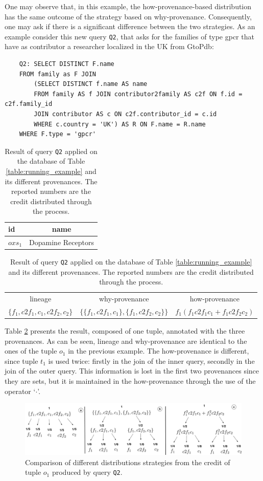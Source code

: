 One may observe that, in this example, the how-provenance-based distribution has the same outcome of the strategy based on why-provenance. Consequently, one may ask if there is a significant difference between the two strategies. 
As an example consider this new query \texttt{Q2}, that asks for the families of type gpcr that have as contributor a researcher localized in the UK from GtoPdb:
\begin{verbatim}
	Q2: SELECT DISTINCT F.name 
	FROM family as F JOIN
		(SELECT DISTINCT f.name AS name
		FROM family AS f JOIN contributor2family AS c2f ON f.id = c2f.family_id
		JOIN contributor AS c ON c2f.contributor_id = c.id
		WHERE c.country = 'UK') AS R ON F.name = R.name
	WHERE F.type = 'gpcr'
\end{verbatim}

\begin{table}[]
\centering
  \begin{tabular}{|l|c|}
  \hline
    id & name\\
    \hline
    $oxs_1$ &  Dopamine Receptors\\
    \hline
  \end{tabular}
  \begin{tabular}{c | c | c}
  	lineage & why-provenance & how-provenance   \\
  	$\{f_1, c2f_1, c_1, c2f_2, c_2\}$ & $\{\{f_1, c2f_1, c_1\}, \{f_1, c2f_2, c_2\}\}$ & $f_1(f_1 c2f_1 c_1 + f_1 c2f_2 c_2)$\\
  \end{tabular}
    \caption{Result of query \texttt{Q2} applied on the database of Table \ref{table:running_example} and its different provenances. The reported numbers are the credit distributed through the process.}
  \label{table:difference_result}
\end{table}

Table \ref{table:difference_result} presents the result, composed of one tuple, annotated with the three provenances. As can be seen, lineage and why-provenance are identical to the ones of the tuple $o_1$ in the previous example. 
The how-provenance is different, since tuple $t_1$ is used twice: firstly in the join of the inner query, secondly in the join of the outer query. This information is lost in the first two provenances since they are sets, but it is maintained in the how-provenance through the use of the operator `$\cdot$'.

\begin{figure}[]
  \includegraphics[width=\textwidth]{figures/how_distribution}
  \caption{Comparison of different distributions strategies from the credit of tuple $o_1$ produced by query \texttt{Q2}.}
  \label{figure:distributions_differences}
\end{figure}


